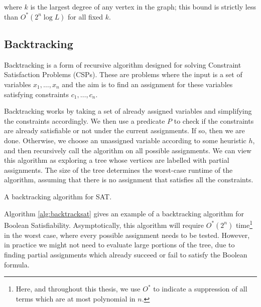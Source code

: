 \noindent where $k$ is the largest degree of any vertex in the graph; this bound is strictly less than $O^*(2^n\log L)$ for all fixed $k$.

\subsection{Backtracking}
\label{sec:backtrack}

Backtracking is a form of recursive algorithm designed for solving Constraint Satisfaction Problems (CSPs). These are problems where the input is a set of variables $x_1,\dots,x_n$ and the aim is to find an assignment for these variables satisfying constraints $c_1,\dots,c_n$.

Backtracking works by taking a set of already assigned variables and simplifying the constraints accordingly. We then use a predicate $P$ to check if the constraints are already satisfiable or not under the current assignments. If so, then we are done. Otherwise, we choose an unassigned variable according to some heuristic $h$, and then recursively call the algorithm on all possible assignments. We can view this algorithm as exploring a tree whose vertices are labelled with partial assignments. The size of the tree determines the worst-case runtime of the algorithm, assuming that there is no assignment that satisfies all the constraints.

\begin{algorithm}
\caption{\label{alg:backtracksat} A backtracking algorithm for SAT.}
\end{algorithm}

Algorithm \ref{alg:backtracksat} gives an example of a backtracking algorithm for Boolean Satisfiability. Asymptotically, this algorithm will require $O^*(2^n)$ time\footnote{Here, and throughout this thesis, we use $O^*$ to indicate a suppression of all terms which are at most polynomial in $n$.} in the worst case, where every possible assignment needs to be tested. However, in practice we might not need to evaluate large portions of the tree, due to finding partial assignments which already succeed or fail to satisfy the Boolean formula.

